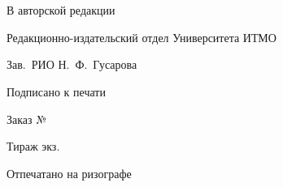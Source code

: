 \thispagestyle{empty}

\vspace*{\fill}

\begin{center}
    \docAuthorsFull%
    \\[2\baselineskip]
    \textbf{\large \docTitle}
    \\[\baselineskip]
    \textbf{\docType}
\end{center}

\vspace*{\fill}

\noindent
В авторской редакции

\noindent
Редакционно-издательский отдел Университета ИТМО

\noindent
Зав.\ РИО \hfill Н.\ Ф.\ Гусарова

\noindent
Подписано к печати

\noindent
Заказ №

\noindent
Тираж \qquad \quad экз.

\noindent
Отпечатано на ризографе
